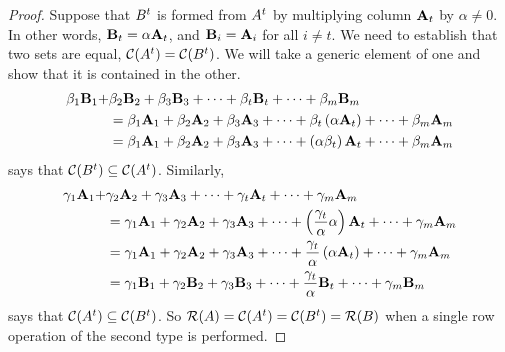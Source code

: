 \documentclass{ximera}
\begin{document}
\begin{theorem}
\begin{proof}
    Suppose that $B^{t}$ is formed from $A^{t}$ by
    multiplying column $\mathbf{A}_t$ by $\alpha\neq 0$.  In other
    words, $\mathbf{B}_t=\alpha\mathbf{A}_t$, and $\mathbf{B}_i=\mathbf{A}_i$
    for all $i\neq t$.  We need to establish that two sets are equal,
    $\mathcal{C}\!\left(A^{t}\right)=\mathcal{C}\!\left(B^{t}\right)$.  We will take a generic
    element of one and show that it is contained in the other.
    \begin{align*}
      \beta_1\mathbf{B}_1+
      &
        \beta_2\mathbf{B}_2+
        \beta_3\mathbf{B}_3+
        \cdots+
        \beta_t\mathbf{B}_t+
        \cdots+
        \beta_m\mathbf{B}_m\\
      &=
        \beta_1\mathbf{A}_1+
        \beta_2\mathbf{A}_2+
        \beta_3\mathbf{A}_3+
        \cdots+
        \beta_t\left(\alpha\mathbf{A}_t\right)+
        \cdots+
        \beta_m\mathbf{A}_m\\
      &=
        \beta_1\mathbf{A}_1+
        \beta_2\mathbf{A}_2+
        \beta_3\mathbf{A}_3+
        \cdots+
        \left(\alpha\beta_t\right)\mathbf{A}_t+
        \cdots+
        \beta_m\mathbf{A}_m
    \end{align*}
    says that $\mathcal{C}\!\left(B^{t}\right)\subseteq\mathcal{C}\!\left(A^{t}\right)$.  Similarly,
    \begin{align*}
      \gamma_1\mathbf{A}_1+
      &
        \gamma_2\mathbf{A}_2+
        \gamma_3\mathbf{A}_3+
        \cdots+
        \gamma_t\mathbf{A}_t+
        \cdots+
        \gamma_m\mathbf{A}_m\\
      &=
        \gamma_1\mathbf{A}_1+
        \gamma_2\mathbf{A}_2+
        \gamma_3\mathbf{A}_3+
        \cdots+
        \left(\frac{\gamma_t}{\alpha}\alpha\right)\mathbf{A}_t+
        \cdots+
        \gamma_m\mathbf{A}_m\\
      &=
        \gamma_1\mathbf{A}_1+
        \gamma_2\mathbf{A}_2+
        \gamma_3\mathbf{A}_3+
        \cdots+
        \frac{\gamma_t}{\alpha}\left(\alpha\mathbf{A}_t\right)+
        \cdots+
        \gamma_m\mathbf{A}_m\\
      &=
        \gamma_1\mathbf{B}_1+
        \gamma_2\mathbf{B}_2+
        \gamma_3\mathbf{B}_3+
        \cdots+
        \frac{\gamma_t}{\alpha}\mathbf{B}_t+
        \cdots+
        \gamma_m\mathbf{B}_m
    \end{align*}
    says that $\mathcal{C}\!\left(A^{t}\right)\subseteq\mathcal{C}\!\left(B^{t}\right)$.  So
    $\mathcal{R}\!\left(A\right)=\mathcal{C}\!\left(A^{t}\right)=\mathcal{C}\!\left(B^{t}\right)=\mathcal{R}\!\left(B\right)$ when a
    single row operation of the second type is performed.


\end{proof}
\end{theorem}
\end{document}
